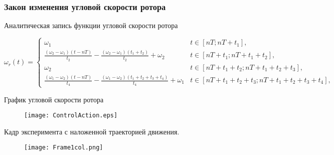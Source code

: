 \begin{frame}
\frametitle{Закон изменения угловой скорости ротора}

Аналитическая запись функции угловой скорости ротора

\scriptsize 
\begin{equation*}
\omega_r(t) =
\begin{cases}

\omega_1 & t \in \left[ nT;  nT + t_1 \right] ,\\

\frac{(\omega_2 - \omega_1)(t-nT)}{t_2} - \frac{(\omega_2 - \omega_1)(t_1+t_2)}{t_2} + \omega_2 & t \in \left[ nT + t_1;  nT + t_1+t_2 \right], \\

\omega_2 & t \in \left[ nT + t_1+t_2;  nT + t_1+t_2+t_3 \right] ,\\

\frac{(\omega_1 - \omega_2)(t-nT)}{t_4} - \frac{(\omega_1 - \omega_2)(t_1+t_2+t_3+t_4)}{t_4} + \omega_1 &t \in \left[ nT + t_1 + t_2+t_3;  nT + t_1+t_2+t_3+t_4 \right] ,

\end{cases}
\label{omegaRotorGeneral}
\end{equation*}

\small 

\begin{minipage}[t]{0.47\linewidth}
График угловой скорости ротора

	\begin{figure}[!ht]
		\centering
		\texttt{[image: ControlAction.eps]}
	\end{figure}
	
\end{minipage}	
\hfill
\begin{minipage}[t]{0.47\linewidth}
Кадр эксперимента с наложенной траекторией движения.

\begin{figure}[!h]
	\centering
	\texttt{[image: Frame1col.png]}
\end{figure}

\end{minipage}	


\vspace{5mm}



\end{frame}

